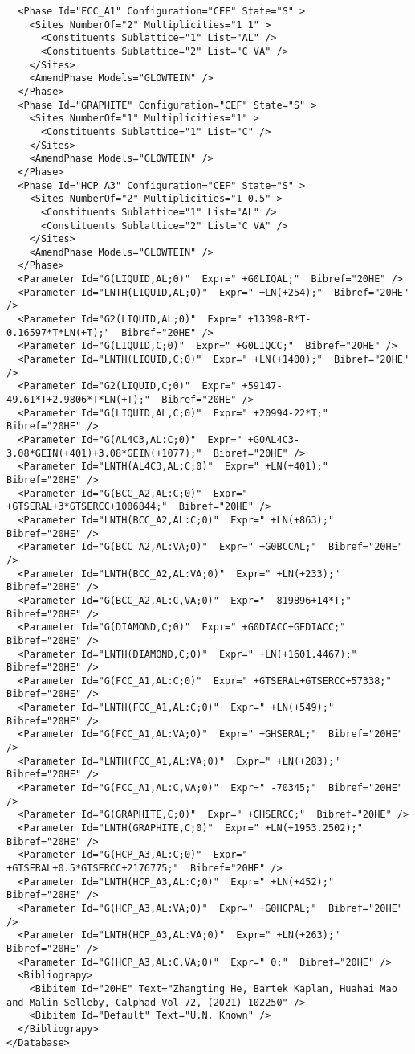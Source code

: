 \documentclass{article}
\begin{document}
\begin{appendices}
{\begin{verbatim}
  <Phase Id="FCC_A1" Configuration="CEF" State="S" >
    <Sites NumberOf="2" Multiplicities="1 1" >
      <Constituents Sublattice="1" List="AL" />
      <Constituents Sublattice="2" List="C VA" />
    </Sites>
    <AmendPhase Models="GLOWTEIN" />
  </Phase>
  <Phase Id="GRAPHITE" Configuration="CEF" State="S" >
    <Sites NumberOf="1" Multiplicities="1" >
      <Constituents Sublattice="1" List="C" />
    </Sites>
    <AmendPhase Models="GLOWTEIN" />
  </Phase>
  <Phase Id="HCP_A3" Configuration="CEF" State="S" >
    <Sites NumberOf="2" Multiplicities="1 0.5" >
      <Constituents Sublattice="1" List="AL" />
      <Constituents Sublattice="2" List="C VA" />
    </Sites>
    <AmendPhase Models="GLOWTEIN" />
  </Phase>
  <Parameter Id="G(LIQUID,AL;0)"  Expr=" +G0LIQAL;"  Bibref="20HE" />
  <Parameter Id="LNTH(LIQUID,AL;0)"  Expr=" +LN(+254);"  Bibref="20HE" />
  <Parameter Id="G2(LIQUID,AL;0)"  Expr=" +13398-R*T-0.16597*T*LN(+T);"  Bibref="20HE" />
  <Parameter Id="G(LIQUID,C;0)"  Expr=" +G0LIQCC;"  Bibref="20HE" />
  <Parameter Id="LNTH(LIQUID,C;0)"  Expr=" +LN(+1400);"  Bibref="20HE" />
  <Parameter Id="G2(LIQUID,C;0)"  Expr=" +59147-49.61*T+2.9806*T*LN(+T);"  Bibref="20HE" />
  <Parameter Id="G(LIQUID,AL,C;0)"  Expr=" +20994-22*T;"  Bibref="20HE" />
  <Parameter Id="G(AL4C3,AL:C;0)"  Expr=" +G0AL4C3-3.08*GEIN(+401)+3.08*GEIN(+1077);"  Bibref="20HE" />
  <Parameter Id="LNTH(AL4C3,AL:C;0)"  Expr=" +LN(+401);"  Bibref="20HE" />
  <Parameter Id="G(BCC_A2,AL:C;0)"  Expr=" +GTSERAL+3*GTSERCC+1006844;"  Bibref="20HE" />
  <Parameter Id="LNTH(BCC_A2,AL:C;0)"  Expr=" +LN(+863);"  Bibref="20HE" />
  <Parameter Id="G(BCC_A2,AL:VA;0)"  Expr=" +G0BCCAL;"  Bibref="20HE" />
  <Parameter Id="LNTH(BCC_A2,AL:VA;0)"  Expr=" +LN(+233);"  Bibref="20HE" />
  <Parameter Id="G(BCC_A2,AL:C,VA;0)"  Expr=" -819896+14*T;"  Bibref="20HE" />
  <Parameter Id="G(DIAMOND,C;0)"  Expr=" +G0DIACC+GEDIACC;"  Bibref="20HE" />
  <Parameter Id="LNTH(DIAMOND,C;0)"  Expr=" +LN(+1601.4467);"  Bibref="20HE" />
  <Parameter Id="G(FCC_A1,AL:C;0)"  Expr=" +GTSERAL+GTSERCC+57338;"  Bibref="20HE" />
  <Parameter Id="LNTH(FCC_A1,AL:C;0)"  Expr=" +LN(+549);"  Bibref="20HE" />
  <Parameter Id="G(FCC_A1,AL:VA;0)"  Expr=" +GHSERAL;"  Bibref="20HE" />
  <Parameter Id="LNTH(FCC_A1,AL:VA;0)"  Expr=" +LN(+283);"  Bibref="20HE" />
  <Parameter Id="G(FCC_A1,AL:C,VA;0)"  Expr=" -70345;"  Bibref="20HE" />
  <Parameter Id="G(GRAPHITE,C;0)"  Expr=" +GHSERCC;"  Bibref="20HE" />
  <Parameter Id="LNTH(GRAPHITE,C;0)"  Expr=" +LN(+1953.2502);"  Bibref="20HE" />
  <Parameter Id="G(HCP_A3,AL:C;0)"  Expr=" +GTSERAL+0.5*GTSERCC+2176775;"  Bibref="20HE" />
  <Parameter Id="LNTH(HCP_A3,AL:C;0)"  Expr=" +LN(+452);"  Bibref="20HE" />
  <Parameter Id="G(HCP_A3,AL:VA;0)"  Expr=" +G0HCPAL;"  Bibref="20HE" />
  <Parameter Id="LNTH(HCP_A3,AL:VA;0)"  Expr=" +LN(+263);"  Bibref="20HE" />
  <Parameter Id="G(HCP_A3,AL:C,VA;0)"  Expr=" 0;"  Bibref="20HE" />
  <Bibliograpy>
    <Bibitem Id="20HE" Text="Zhangting He, Bartek Kaplan, Huahai Mao and Malin Selleby, Calphad Vol 72, (2021) 102250" /> 
    <Bibitem Id="Default" Text="U.N. Known" /> 
  </Bibliograpy>
</Database>
\end{verbatim}
}


\end{appendices}
\end{document}
